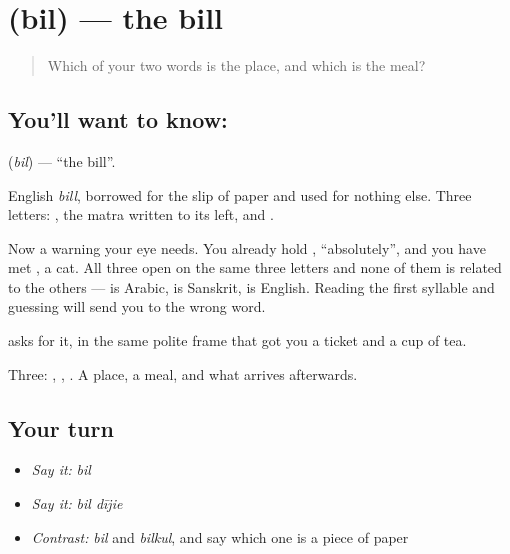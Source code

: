 \section[\texorpdfstring{\hi{बिल} (bil)}{बिल (bil)}]{ (bil) — the bill}

\label{lesson:HI-C73-bill}



\begin{quote}
Which of your two words is the place, and which is the meal?
\end{quote}

\subsection*{You'll want to know: }
\textbf{} (\emph{bil}) — \textquotedblleft{}the bill\textquotedblright{}.

English \emph{bill}, borrowed for the slip of paper and used for nothing else. Three letters: , the  matra written to its left, and .

Now a warning your eye needs. You already hold \textbf{}, \textquotedblleft{}absolutely\textquotedblright{}, and you have met \textbf{}, a cat. All three open on the same three letters and none of them is related to the others —  is Arabic,  is Sanskrit,  is English. Reading the first syllable and guessing will send you to the wrong word.

\textbf{ } asks for it, in the same polite frame that got you a ticket and a cup of tea.

\begin{grammarlens}[title={What you've built}]
Three: , , . A place, a meal, and what arrives afterwards.
\end{grammarlens}

\subsection*{Your turn}
\begin{itemize}
\raggedright
  \item \emph{Say it:} \emph{bil}
  \item \emph{Say it:} \emph{bil dījie}
  \item \emph{Contrast:} \emph{bil} and \emph{bilkul}, and say which one is a piece of paper
\end{itemize}

